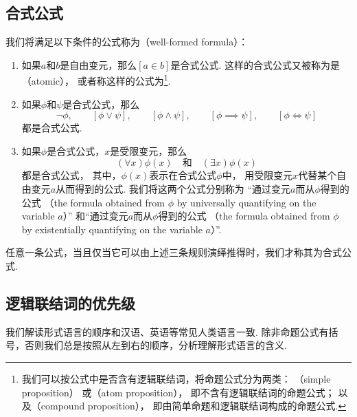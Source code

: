 \subsection{合式公式}
我们将满足以下条件的公式称为（well-formed formula）：%
\begin{enumerate}
	\item 如果\(a\)和\(b\)是自由变元，那么\([a \in b]\)是合式公式.
	这样的合式公式又被称为是（atomic），
	或者称这样的公式为\footnote{%
	我们可以按公式中是否含有逻辑联结词，将命题公式分为两类：
	（simple proposition）%
	或（atom proposition），
	即不含有逻辑联结词的命题公式；
	以及（compound proposition），
	即由简单命题和逻辑联结词构成的命题公式.
	}.

	\item 如果\(\phi\)和\(\psi\)是合式公式，那么\[
		\neg \phi, \qquad
		[\phi \lor \psi], \qquad
		[\phi \land \psi], \qquad
		[\phi \implies \psi], \qquad
		[\phi \iff \psi]
	\]都是合式公式.

	\item 如果\(\phi\)是合式公式，\(x\)是受限变元，那么\[
		(\forall x) \phi(x)
		\quad\text{和}\quad
		(\exists x) \phi(x)
	\]都是合式公式，
	其中，\(\phi(x)\)表示在合式公式\(\phi\)中，
	用受限变元\(x\)代替某个自由变元\(a\)从而得到的公式.
	我们将这两个公式分别称为%
	“通过变元\(a\)而从\(\phi\)得到的公式%
	（the formula obtained from \(\phi\) by universally quantifying on the variable \(a\)）”%
	和“通过变元\(a\)而从\(\phi\)得到的公式%
	（the formula obtained from \(\phi\) by existentially quantifying on the variable \(a\)）”.
\end{enumerate}
任意一条公式，当且仅当它可以由上述三条规则演绎推得时，我们才称其为合式公式.

\subsection{逻辑联结词的优先级}
我们解读形式语言的顺序和汉语、英语等常见人类语言一致.
除非命题公式有括号，否则我们总是按照从左到右的顺序，分析理解形式语言的含义.

